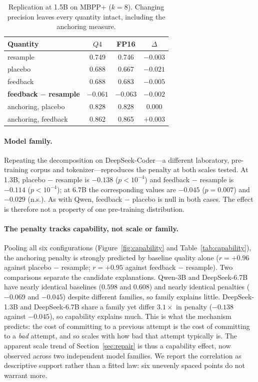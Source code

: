 \begin{table}[t]
  \centering
  \small
  \caption{Replication at 1.5B on MBPP+ ($k{=}8$). Changing precision leaves
  every quantity intact, including the anchoring measure.}
  \label{tab:replication}
  \begin{tabular}{lccc}
    \toprule
    Quantity & $Q4$ & FP16 & $\Delta$ \\
    \midrule
    resample                 & 0.749 & 0.746 & $-0.003$ \\
    placebo                  & 0.688 & 0.667 & $-0.021$ \\
    feedback                 & 0.688 & 0.683 & $-0.005$ \\
    \textbf{feedback $-$ resample} & $\mathbf{-0.061}$ & $\mathbf{-0.063}$ & $-0.002$ \\
    \midrule
    anchoring, placebo       & 0.828 & 0.828 & $0.000$ \\
    anchoring, feedback      & 0.862 & 0.865 & $+0.003$ \\
    \bottomrule
  \end{tabular}
\end{table}

\paragraph{Model family.}
Repeating the decomposition on DeepSeek-Coder---a different laboratory,
pre-training corpus and tokenizer---reproduces the penalty at both scales
tested. At 1.3B, \textsf{placebo} $-$ \textsf{resample} is $-0.138$
($p<10^{-4}$) and \textsf{feedback} $-$ \textsf{resample} is $-0.114$
($p<10^{-4}$); at 6.7B the corresponding values are $-0.045$ ($p{=}0.007$)
and $-0.029$ (n.s.). As with Qwen, \textsf{feedback} $-$ \textsf{placebo} is
null in both cases. The effect is therefore not a property of one
pre-training distribution.

\paragraph{The penalty tracks capability, not scale or family.}
Pooling all six configurations (Figure~\ref{fig:capability} and
Table~\ref{tab:capability}), the anchoring
penalty is strongly predicted by baseline quality alone
($r{=}{+}0.96$ against \textsf{placebo} $-$ \textsf{resample};
$r{=}{+}0.95$ against \textsf{feedback} $-$ \textsf{resample}). Two
comparisons separate the candidate explanations. Qwen-3B and DeepSeek-6.7B
have nearly identical baselines ($0.598$ and $0.608$) and nearly identical
penalties ($-0.069$ and $-0.045$) despite different families, so family
explains little. DeepSeek-1.3B and DeepSeek-6.7B share a family yet differ
$3.1\times$ in penalty ($-0.138$ against $-0.045$), so capability explains
much. This is what the mechanism predicts: the cost of committing to a
previous attempt is the cost of committing to a \emph{bad} attempt, and so
scales with how bad that attempt typically is. The apparent scale trend of
Section~\ref{sec:repair} is thus a capability effect, now observed across two
independent model families. We report the correlation as descriptive support
rather than a fitted law: six unevenly spaced points do not warrant more.

